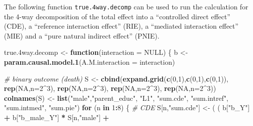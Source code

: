 \documentclass[
]{book}
\newenvironment{Shaded}{\begin{snugshade}}{\end{snugshade}}
\newcommand{\AttributeTok}[1]{\textcolor[rgb]{0.13,0.29,0.53}{#1}}
\newcommand{\CommentTok}[1]{\textcolor[rgb]{0.56,0.35,0.01}{\textit{#1}}}
\newcommand{\ConstantTok}[1]{\textcolor[rgb]{0.56,0.35,0.01}{#1}}
\newcommand{\ControlFlowTok}[1]{\textcolor[rgb]{0.13,0.29,0.53}{\textbf{#1}}}
\newcommand{\DecValTok}[1]{\textcolor[rgb]{0.00,0.00,0.81}{#1}}
\newcommand{\FloatTok}[1]{\textcolor[rgb]{0.00,0.00,0.81}{#1}}
\newcommand{\FunctionTok}[1]{\textcolor[rgb]{0.13,0.29,0.53}{\textbf{#1}}}
\newcommand{\NormalTok}[1]{#1}
\newcommand{\OtherTok}[1]{\textcolor[rgb]{0.56,0.35,0.01}{#1}}
\newcommand{\SpecialCharTok}[1]{\textcolor[rgb]{0.81,0.36,0.00}{\textbf{#1}}}
\newcommand{\StringTok}[1]{\textcolor[rgb]{0.31,0.60,0.02}{#1}}
\begin{document}
The following function \texttt{true.4way.decomp} can be used to run the calculation for the 4-way decomposition of the total effect into a ``controlled direct effect'' (CDE), a ``reference interaction effect'' (RIE), a ``mediated interaction effect'' (MIE) and a ``pure natural indirect effect'' (PNIE).

\begin{Shaded}
\begin{Highlighting}[]
\NormalTok{true}\FloatTok{.4}\NormalTok{way.decomp }\OtherTok{\textless{}{-}} \ControlFlowTok{function}\NormalTok{(}\AttributeTok{interaction =} \ConstantTok{NULL}\NormalTok{) \{}
\NormalTok{  b }\OtherTok{\textless{}{-}} \FunctionTok{param.causal.model.1}\NormalTok{(}\AttributeTok{A.M.interaction =}\NormalTok{ interaction)}
  
  \CommentTok{\# binary outcome (death)}
\NormalTok{  S }\OtherTok{\textless{}{-}} \FunctionTok{cbind}\NormalTok{(}\FunctionTok{expand.grid}\NormalTok{(}\FunctionTok{c}\NormalTok{(}\DecValTok{0}\NormalTok{,}\DecValTok{1}\NormalTok{),}\FunctionTok{c}\NormalTok{(}\DecValTok{0}\NormalTok{,}\DecValTok{1}\NormalTok{),}\FunctionTok{c}\NormalTok{(}\DecValTok{0}\NormalTok{,}\DecValTok{1}\NormalTok{)), }\FunctionTok{rep}\NormalTok{(}\ConstantTok{NA}\NormalTok{,}\AttributeTok{n=}\DecValTok{2}\SpecialCharTok{\^{}}\DecValTok{3}\NormalTok{), }\FunctionTok{rep}\NormalTok{(}\ConstantTok{NA}\NormalTok{,}\AttributeTok{n=}\DecValTok{2}\SpecialCharTok{\^{}}\DecValTok{3}\NormalTok{), }
             \FunctionTok{rep}\NormalTok{(}\ConstantTok{NA}\NormalTok{,}\AttributeTok{n=}\DecValTok{2}\SpecialCharTok{\^{}}\DecValTok{3}\NormalTok{), }\FunctionTok{rep}\NormalTok{(}\ConstantTok{NA}\NormalTok{,}\AttributeTok{n=}\DecValTok{2}\SpecialCharTok{\^{}}\DecValTok{3}\NormalTok{))}
  \FunctionTok{colnames}\NormalTok{(S) }\OtherTok{\textless{}{-}} \FunctionTok{list}\NormalTok{(}\StringTok{"male"}\NormalTok{,}\StringTok{"parent\_educ"}\NormalTok{, }\StringTok{"L1"}\NormalTok{, }\StringTok{"sum.cde"}\NormalTok{, }\StringTok{"sum.intref"}\NormalTok{, }
                      \StringTok{"sum.intmed"}\NormalTok{, }\StringTok{"sum.pie"}\NormalTok{)}
  \ControlFlowTok{for}\NormalTok{ (n }\ControlFlowTok{in} \DecValTok{1}\SpecialCharTok{:}\DecValTok{8}\NormalTok{) \{}
    \CommentTok{\# CDE }
\NormalTok{    S[n,}\StringTok{"sum.cde"}\NormalTok{] }\OtherTok{\textless{}{-}}\NormalTok{ ( ( b[}\StringTok{"b\_Y"}\NormalTok{] }\SpecialCharTok{+} 
\NormalTok{                            b[}\StringTok{"b\_male\_Y"}\NormalTok{] }\SpecialCharTok{*}\NormalTok{ S[n,}\StringTok{"male"}\NormalTok{] }\SpecialCharTok{+} 

\end{Highlighting}
\end{Shaded}
\end{document}
